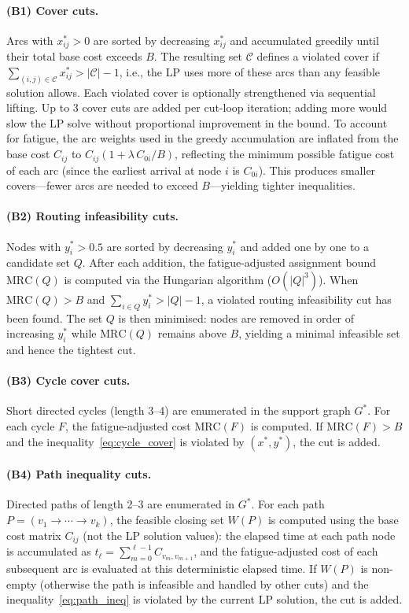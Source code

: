 \documentclass[preprint,11pt]{elsarticle}
\begin{document}
\paragraph{(B1) Cover cuts.}
Arcs with $x_{ij}^* > 0$ are sorted by decreasing $x_{ij}^*$ and accumulated greedily until their total base cost exceeds $B$.
The resulting set $\mathcal{C}$ defines a violated cover if $\sum_{(i,j) \in \mathcal{C}} x_{ij}^* > |\mathcal{C}| - 1$, i.e., the LP uses more of these arcs than any feasible solution allows.
Each violated cover is optionally strengthened via sequential lifting.
Up to 3 cover cuts are added per cut-loop iteration; adding more would slow the LP solve without proportional improvement in the bound.
To account for fatigue, the arc weights used in the greedy accumulation are inflated from the base cost $C_{ij}$ to $C_{ij}(1 + \lambda\, C_{0i} / B)$, reflecting the minimum possible fatigue cost of each arc (since the earliest arrival at node $i$ is $C_{0i}$).
This produces smaller covers---fewer arcs are needed to exceed $B$---yielding tighter inequalities.

\paragraph{(B2) Routing infeasibility cuts.}
Nodes with $y_i^* > 0.5$ are sorted by decreasing $y_i^*$ and added one by one to a candidate set $Q$.
After each addition, the fatigue-adjusted assignment bound $\text{MRC}(Q)$ is computed via the Hungarian algorithm ($O(|Q|^3)$).
When $\text{MRC}(Q) > B$ and $\sum_{i \in Q} y_i^* > |Q| - 1$, a violated routing infeasibility cut has been found.
The set $Q$ is then minimised: nodes are removed in order of increasing $y_i^*$ while $\text{MRC}(Q)$ remains above $B$, yielding a minimal infeasible set and hence the tightest cut.

\paragraph{(B3) Cycle cover cuts.}
Short directed cycles (length 3--4) are enumerated in the support graph $G^*$.
For each cycle $F$, the fatigue-adjusted cost $\text{MRC}(F)$ is computed.
If $\text{MRC}(F) > B$ and the inequality~\eqref{eq:cycle_cover} is violated by $(x^*, y^*)$, the cut is added.

\paragraph{(B4) Path inequality cuts.}
Directed paths of length 2--3 are enumerated in $G^*$.
For each path $P = (v_1 \to \cdots \to v_k)$, the feasible closing set $W(P)$ is computed using the base cost matrix $C_{ij}$ (not the LP solution values): the elapsed time at each path node is accumulated as $t_\ell = \sum_{m=0}^{\ell-1} C_{v_m, v_{m+1}}$, and the fatigue-adjusted cost of each subsequent arc is evaluated at this deterministic elapsed time.
If $W(P)$ is non-empty (otherwise the path is infeasible and handled by other cuts) and the inequality~\eqref{eq:path_ineq} is violated by the current LP solution, the cut is added.
\end{document}
